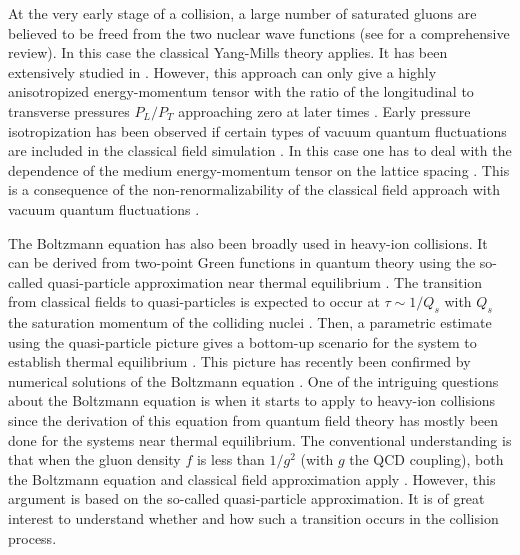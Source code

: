 \documentclass[onecolumn,showpacs,nobibnotes,nofootinbib,12pt,aps,prd,showpacs,notitlepage,nofootinbib,preprintnumbers,amsmath,amssymb]{article}
\begin{document}
At the very early stage of a collision, a large number of saturated
gluons are believed to be freed from the two nuclear wave functions
(see \cite{Gelis:2010nm, KovchegovLevin} for a comprehensive
review). In this case the classical Yang-Mills theory applies. It has
been extensively studied in
\cite{McLerran:1993ni,McLerran:1993ka,McLerran:1994vd,Kovchegov:1996ty,Ayala:1996hx,Kovchegov:1997ke,Krasnitz:1998ns,Krasnitz:1999wc,Krasnitz:2003nv,Lappi:2003bi,Kovchegov:2005ss,Berges:2013fga,Gelis:2013rba}. However,
this approach can only give a highly anisotropized energy-momentum
tensor with the ratio of the longitudinal to transverse pressures
$P_L/P_T$ approaching zero at later times
\cite{Krasnitz:1998ns,Krasnitz:1999wc,Krasnitz:2003nv,Kovchegov:2005ss,Berges:2013fga}. Early
pressure isotropization has been observed if certain types of vacuum
quantum fluctuations are included in the classical field simulation
\cite{Epelbaum:2013waa,Gelis:2013rba}. In this case one has to deal with the
dependence of the medium energy-momentum tensor on the lattice spacing
\cite{Gelis:2013rba,Berges:2013lsa}. This is a consequence of the
non-renormalizability of the classical field approach with vacuum
quantum fluctuations \cite{Epelbaum:2014yja,Epelbaum:2014mfa}.

The Boltzmann equation has also been broadly used in heavy-ion
collisions. It can be derived from two-point Green functions in
quantum theory using the so-called quasi-particle approximation near
thermal equilibrium
\cite{Kadanoff,Chou:1984es,Calzetta:1986cq,Blaizot:2001nr,Arnold:2002zm}. The
transition from classical fields to quasi-particles is expected to
occur at $\tau\sim 1/Q_s$ with $Q_s$ the saturation momentum of the
colliding nuclei \cite{Baier:2000sb}. Then, a parametric estimate
using the quasi-particle picture gives a bottom-up scenario for the
system to establish thermal equilibrium \cite{Baier:2000sb}. This
picture has recently been confirmed by numerical solutions of the
Boltzmann equation \cite{Kurkela:2015qoa}. One of the intriguing
questions about the Boltzmann equation is when it starts to apply to
heavy-ion collisions since the derivation of this equation from
quantum field theory has mostly been done for the systems near thermal
equilibrium. The conventional understanding is that when the gluon
density $f$ is less than $1/g^2$ (with $g$ the QCD coupling), both the
Boltzmann equation and classical field approximation apply
\cite{Mueller:2002gd}. However, this argument is based on the
so-called quasi-particle approximation. It is of great interest to
understand whether and how such a transition occurs in the collision
process.
\end{document}
